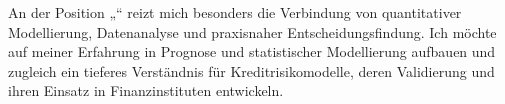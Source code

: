 An der Position „\position{}“ reizt mich besonders die Verbindung von {quantitativer Modellierung, Datenanalyse und praxisnaher Entscheidungsfindung}. Ich möchte auf meiner Erfahrung in Prognose und statistischer Modellierung aufbauen und zugleich ein tieferes Verständnis für {Kreditrisikomodelle, deren Validierung und ihren Einsatz in Finanzinstituten} entwickeln.